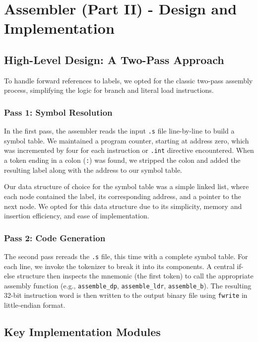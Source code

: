 \documentclass[11pt]{article}
\begin{document}
\section{Assembler (Part II) - Design and Implementation}

\subsection{High-Level Design: A Two-Pass Approach}

To handle forward references to labels, we opted for the classic two-pass assembly process, 
simplifying the logic for branch and literal load instructions.

\subsubsection{Pass 1: Symbol Resolution}
In the first pass, the assembler reads the input \texttt{.s} file line-by-line to build a symbol table. 
We maintained a program counter, starting at address zero, which was incremented by four for each instruction or \texttt{.int} 
directive encountered. When a token ending in a colon (\texttt{:}) was found, 
we stripped the colon and added the resulting label along with the address to our symbol table. 

Our data structure of choice for the symbol table was a simple linked list, where each node contained the label,
its corresponding address, and a pointer to the next node. We opted for this data structure due to its simplicity, 
memory and insertion efficiency, and ease of implementation.  


\subsubsection{Pass 2: Code Generation}
The second pass rereads the \texttt{.s} file, this time with a complete symbol table. 
For each line, we invoke the tokenizer to break it into its components. 
A central if-else structure then inspects the mnemonic (the first token) to call the appropriate assembly function 
(e.g., \texttt{assemble\_dp}, \texttt{assemble\_ldr}, \texttt{assemble\_b}). 
The resulting 32-bit instruction word is then written to the output binary file using \texttt{fwrite} in little-endian format.

\subsection{Key Implementation Modules}
\end{document}
